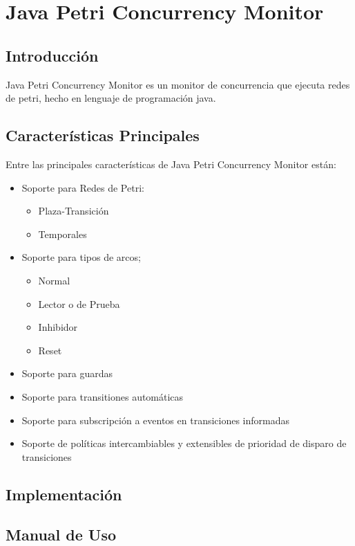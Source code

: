 \newcommand{\javapetriconcurrencymonitor}{Java Petri Concurrency Monitor }

\section{\javapetriconcurrencymonitor}

\subsection{Introducción}

\javapetriconcurrencymonitor  es un monitor de concurrencia que ejecuta redes
de petri, hecho en lenguaje de programación java.

\subsection{Características Principales}
Entre las principales características de \javapetriconcurrencymonitor están:
\begin{itemize}
  \item Soporte para Redes de Petri:
  \begin{itemize}
    \item Plaza-Transición
    \item Temporales
  \end{itemize}
  
  \item Soporte para tipos de arcos;
  \begin{itemize}
    \item Normal
    \item Lector o de Prueba
    \item Inhibidor
    \item Reset
  \end{itemize}
  
  \item Soporte para guardas
  \item Soporte para transitiones automáticas
  \item Soporte para subscripción a eventos en transiciones informadas
  \item Soporte de políticas intercambiables y extensibles de prioridad de
  disparo de transiciones

\end{itemize}

\subsection{Implementación}

\subsection{Manual de Uso}